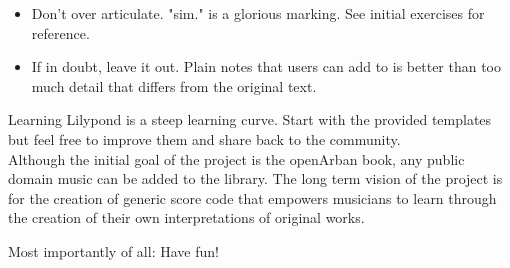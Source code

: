 \documentclass[12pt,a4paper]{article}
\begin{document}
\begin{itemize}
\item Don't over articulate. "sim." is a glorious marking. See initial exercises for reference.
\item If in doubt, leave it out. Plain notes that users can add to is better than too much detail that differs from the original text.
\end{itemize}

Learning Lilypond is a steep learning curve. Start with the provided templates but feel free to improve them and share back to the community.
\\Although the initial goal of the project is the openArban book, any public domain music can be added to the library. The long term vision of the project is for the creation of generic score code that empowers musicians to learn through the creation of their own interpretations of original works.
\par Most importantly of all: Have fun!
\end{document}
